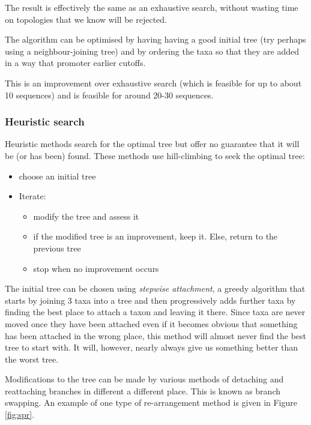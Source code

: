 \documentclass[11pt]{article}
\begin{document}
The result is effectively the same as an exhaustive search, without wasting time on topologies that we know will be rejected.

The algorithm can be optimised by having having a good initial tree  (try perhaps using a neighbour-joining tree) and by ordering the taxa so that they are added in a way that promoter earlier cutoffs.


This is an improvement over exhaustive search (which is feasible for up to about 10 sequences) and is feasible for around 20-30  sequences.  


 

\subsubsection{Heuristic search} \label{sec:heuristicsearch}

Heuristic methods search for the optimal tree but offer no guarantee that it will be (or has been) found. These methods use hill-climbing to seek the optimal tree:
\begin{itemize}
\item    choose an initial tree
  \item Iterate: \begin{itemize} \item modify the tree and assess it
  \item  if the modified tree is an improvement, keep it. Else, return to the previous tree
  \item  stop when no improvement occurs
\end{itemize}
\end{itemize}

The initial tree can be chosen using {\em stepwise attachment}, a greedy algorithm that starts by joining 3 taxa into a tree and then progressively adds further taxa by finding the best place to attach a taxon and leaving it there.  Since taxa are never moved once they have been attached even if it becomes obvious that something has been attached in the wrong place, this method will almost never find the best tree to start with.  It will, however, nearly always give us  something better than the worst tree. 

Modifications to the tree can be made by various methods of detaching and reattaching branches in different a different place.  This is known as branch swapping.  An example of one type of re-arrangement method is given in Figure \ref{fig:spr}.
\end{document}
